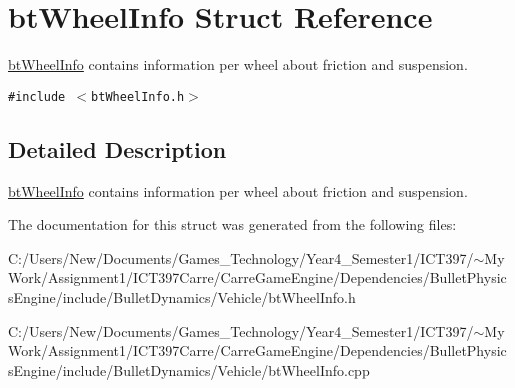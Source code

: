 \hypertarget{structbt_wheel_info}{
\section{btWheelInfo Struct Reference}
\label{structbt_wheel_info}
}
\hyperlink{structbt_wheel_info}{btWheelInfo} contains information per wheel about friction and suspension.  


{\tt \#include $<$btWheelInfo.h$>$}



\subsection{Detailed Description}
\hyperlink{structbt_wheel_info}{btWheelInfo} contains information per wheel about friction and suspension. 

The documentation for this struct was generated from the following files:\begin{CompactItemize}
\item 
C:/Users/New/Documents/Games\_\-Technology/Year4\_\-Semester1/ICT397/$\sim$My Work/Assignment1/ICT397Carre/CarreGameEngine/Dependencies/BulletPhysicsEngine/include/BulletDynamics/Vehicle/btWheelInfo.h\item 
C:/Users/New/Documents/Games\_\-Technology/Year4\_\-Semester1/ICT397/$\sim$My Work/Assignment1/ICT397Carre/CarreGameEngine/Dependencies/BulletPhysicsEngine/include/BulletDynamics/Vehicle/btWheelInfo.cpp\end{CompactItemize}
